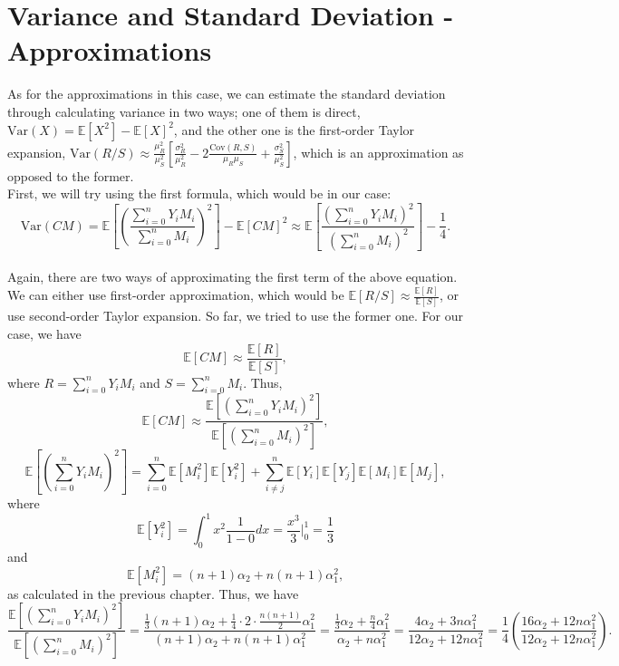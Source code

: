 \documentclass[11pt, twoside, reqno]{book}
\newcommand{\Var}{\text{Var}}
\newcommand{\Cov}{\text{Cov}}
\begin{document}
\section{Variance and Standard Deviation - Approximations}
\label{secB5}
As for the approximations in this case, we can estimate the standard deviation through calculating variance in two ways; one of them is direct, $\Var(X)=\mathbb{E}[X^{2}]-\mathbb{E}[X]^{2}$, and the other one is the first-order Taylor expansion, $\Var(R/S) \approx \frac{\mu_{R}^{2}}{\mu_{S}^{2}}\left[ \frac{\sigma_{R}^{2}}{\mu_{R}^{2}} - 2 \frac{\Cov(R, S)}{\mu_{R}\mu_{S}}+ \frac{\sigma^{2}_{S}}{\mu_{S}^{2}}\right]$, which is an approximation as opposed to the former. \\
First, we will try using the first formula, which would be in our case:
$$\Var(CM) = \mathbb{E}\left[\left(\frac{ \sum^{n}_{i=0}Y_{i}M_{i}}{\sum^{n}_{i=0}M_{i}}\right)^{2}\right] - \mathbb{E}[CM]^{2}\approx \mathbb{E}\left[\frac{\left( \sum^{n}_{i=0}Y_{i}M_{i}\right)^{2}}{\left({\sum^{n}_{i=0}M_{i}}\right)^{2}}\right] -\frac{1}{4}.$$ \\
Again, there are two ways of approximating the first term of the above equation. We can either use first-order approximation, which would be $\mathbb{E}[R/S] \approx \frac{\mathbb{E}[R]}{\mathbb{E}[S]}$, or use second-order Taylor expansion. So far, we tried to use the former one. For our case, we have
$$\mathbb{E}[CM] \approx \frac{\mathbb{E}[R]}{\mathbb{E}[S]},$$
where $R = \sum^{n}_{i=0}Y_{i}M_{i}$ and $S=\sum^{n}_{i=0}M_{i}$. Thus,
$$\mathbb{E}[CM] \approx \frac{\mathbb{E}[\left(\sum^{n}_{i=0}Y_{i}M_{i}\right)^{2}]}{\mathbb{E}[\left(\sum^{n}_{i=0}M_{i}\right)^{2}]},$$
$$\mathbb{E}\left[\left(\sum^{n}_{i=0}Y_{i}M_{i}\right)^{2}\right]=\sum^{n}_{i=0}\mathbb{E}[M_{i}^{2}]\mathbb{E}[Y_{i}^{2}]+\sum^{n}_{i\neq j} \mathbb{E}[Y_{i}]\mathbb{E}[Y_{j}]\mathbb{E}[M_{i}]\mathbb{E}[M_{j}],$$
where
$$\mathbb{E}[Y_{i}^{2}]=\int_{0}^{1}x^{2}\frac{1}{1-0}dx = \frac{x^{3}}{3} \bigg|^{1}_{0}=\frac{1}{3}$$ and
$$\mathbb{E}[M_{i}^{2}]=(n+1)\alpha_{2}+n(n+1)\alpha^{2}_{1},$$
as calculated in the previous chapter. Thus, we have
$$\frac{\mathbb{E}[\left(\sum^{n}_{i=0}Y_{i}M_{i}\right)^{2}]}{\mathbb{E}[\left(\sum^{n}_{i=0}M_{i}\right)^{2}]}=\frac{\frac{1}{3}(n+1)\alpha_{2}+\frac{1}{4}\cdot 2 \cdot \frac{n(n+1)}{2}\alpha_{1}^{2}}{(n+1)\alpha_{2}+n(n+1)\alpha^{2}_{1}} =\frac{\frac{1}{3}\alpha_{2}+\frac{n}{4}\alpha_{1}^{2}}{\alpha_{2}+n\alpha^{2}_{1}}= \frac{4\alpha_{2}+3n\alpha_{1}^{2}}{12\alpha_{2}+12n\alpha^{2}_{1}}=\frac{1}{4}\left(\frac{16\alpha_{2}+12n\alpha_{1}^{2}}{12\alpha_{2}+12n\alpha^{2}_{1}} \right).$$
\end{document}
